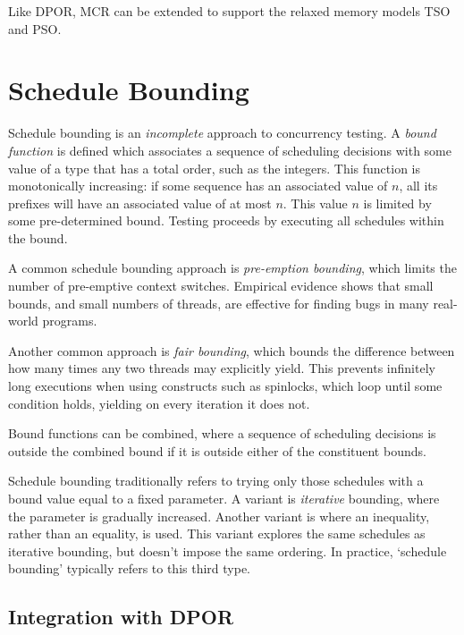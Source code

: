 Like DPOR, MCR can be extended to support the relaxed memory models TSO and
PSO\cite{huang2016}.

\section{Schedule Bounding}
\label{sec:sct-bounding}

Schedule bounding\cite{emmi2011,musuvathi2008,musuvathi2007} is an
\emph{incomplete} approach to concurrency testing.  A \emph{bound function} is
defined which associates a sequence of scheduling decisions with some value of a
type that has a total order, such as the integers.  This function is
monotonically increasing: if some sequence has an associated value of $n$, all
its prefixes will have an associated value of at most $n$.  This value $n$ is
limited by some pre-determined bound.  Testing proceeds by executing all
schedules within the bound.

A common schedule bounding approach is \emph{pre-emption
  bounding}\cite{musuvathi2007}, which limits the number of
pre-emptive context switches.  Empirical evidence shows that small
bounds, and small numbers of threads, are effective for finding bugs
in many real-world programs\cite{thomson2014}.

Another common approach is \emph{fair bounding}\cite{musuvathi2008},
which bounds the difference between how many times any two threads may
explicitly yield.  This prevents infinitely long executions when using
constructs such as spinlocks, which loop until some condition holds,
yielding on every iteration it does not.

Bound functions can be combined, where a sequence of scheduling
decisions is outside the combined bound if it is outside either of the
constituent bounds.

Schedule bounding traditionally refers to trying only those schedules
with a bound value equal to a fixed parameter.  A variant is
\emph{iterative} bounding, where the parameter is gradually
increased\cite{musuvathi2007}.  Another variant is where an
inequality, rather than an equality, is used.  This variant explores
the same schedules as iterative bounding, but doesn't impose the same
ordering.  In practice, `schedule bounding' typically refers to this
third type.

\subsection{Integration with DPOR}

